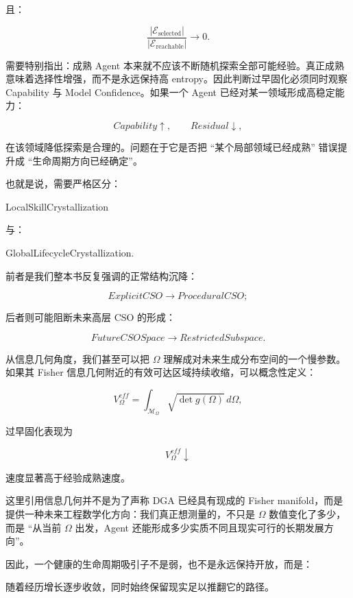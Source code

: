 且：

\[
\frac{
|\mathcal E_{\mathrm{selected}}|
}{
|\mathcal E_{\mathrm{reachable}}|
}
\rightarrow
0.
\]

需要特别指出：成熟 Agent 本来就不应该不断随机探索全部可能经验。真正成熟意味着选择性增强，而不是永远保持高 entropy。因此判断过早固化必须同时观察 Capability 与 Model Confidence。如果一个 Agent 已经对某一领域形成高稳定能力：

\[
Capability\uparrow,\qquad
Residual\downarrow,
\]

在该领域降低探索是合理的。问题在于它是否把 ``某个局部领域已经成熟'' 错误提升成 ``生命周期方向已经确定''。

也就是说，需要严格区分：

\begin{statementbox}
LocalSkillCrystallization
\end{statementbox}

与：

\begin{statementbox}
GlobalLifecycleCrystallization.
\end{statementbox}

前者是我们整本书反复强调的正常结构沉降：

\[
ExplicitCSO
\rightarrow
ProceduralCSO;
\]

后者则可能阻断未来高层 CSO 的形成：

\[
FutureCSOSpace
\rightarrow
RestrictedSubspace.
\]

从信息几何角度，我们甚至可以把 $\Omega$ 理解成对未来生成分布空间的一个慢参数。如果其 Fisher 信息几何附近的有效可达区域持续收缩，可以概念性定义：

\[
V_{\Omega}^{eff}
=
\int_{\mathcal M_{\Omega}}
\sqrt{\det g(\Omega)}
\,d\Omega,
\]

过早固化表现为

\[
V_{\Omega}^{eff}\downarrow
\]

速度显著高于经验成熟速度。

这里引用信息几何并不是为了声称 DGA 已经具有现成的 Fisher manifold，而是提供一种未来工程数学化方向：我们真正想测量的，不只是 $\Omega$ 数值变化了多少，而是 ``从当前 $\Omega$ 出发，Agent 还能形成多少实质不同且现实可行的长期发展方向''。

因此，一个健康的生命周期吸引子不是弱，也不是永远保持开放，而是：

\begin{statementbox}
随着经历增长逐步收敛，同时始终保留现实足以推翻它的路径。
\end{statementbox}

